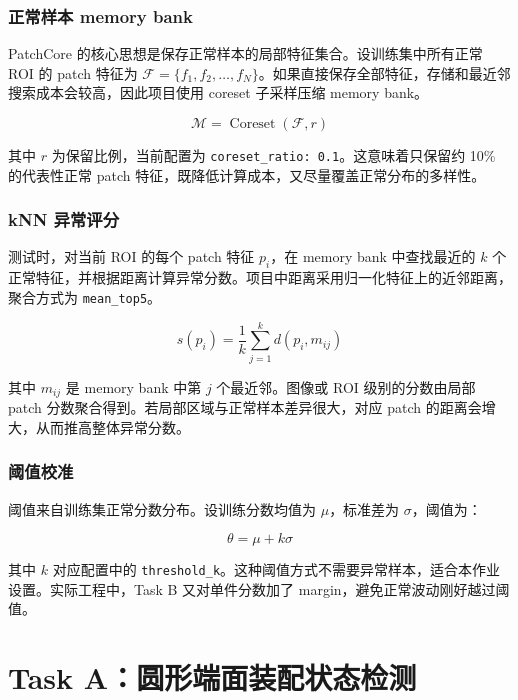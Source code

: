 \documentclass[12pt,hyperref,a4paper,UTF8,fontset=fandol]{ctexart}
\begin{document}
\subsubsection{正常样本 memory bank}

PatchCore 的核心思想是保存正常样本的局部特征集合。设训练集中所有正常 ROI 的 patch 特征为 $\mathcal{F}=\{f_1,f_2,\ldots,f_N\}$。如果直接保存全部特征，存储和最近邻搜索成本会较高，因此项目使用 coreset 子采样压缩 memory bank。

\begin{equation}
    \mathcal{M} = \operatorname{Coreset}(\mathcal{F}, r)
\end{equation}

其中 $r$ 为保留比例，当前配置为 \texttt{coreset\_ratio: 0.1}。这意味着只保留约 10\% 的代表性正常 patch 特征，既降低计算成本，又尽量覆盖正常分布的多样性。

\subsubsection{kNN 异常评分}

测试时，对当前 ROI 的每个 patch 特征 $p_i$，在 memory bank 中查找最近的 $k$ 个正常特征，并根据距离计算异常分数。项目中距离采用归一化特征上的近邻距离，聚合方式为 \texttt{mean\_top5}。

\begin{equation}
    s(p_i)=\frac{1}{k}\sum_{j=1}^{k} d(p_i, m_{ij})
\end{equation}

其中 $m_{ij}$ 是 memory bank 中第 $j$ 个最近邻。图像或 ROI 级别的分数由局部 patch 分数聚合得到。若局部区域与正常样本差异很大，对应 patch 的距离会增大，从而推高整体异常分数。

\subsubsection{阈值校准}

阈值来自训练集正常分数分布。设训练分数均值为 $\mu$，标准差为 $\sigma$，阈值为：

\begin{equation}
    \theta = \mu + k\sigma
\end{equation}

其中 $k$ 对应配置中的 \texttt{threshold\_k}。这种阈值方式不需要异常样本，适合本作业设置。实际工程中，Task B 又对单件分数加了 margin，避免正常波动刚好越过阈值。

\newpage
\section{Task A：圆形端面装配状态检测}
\end{document}
